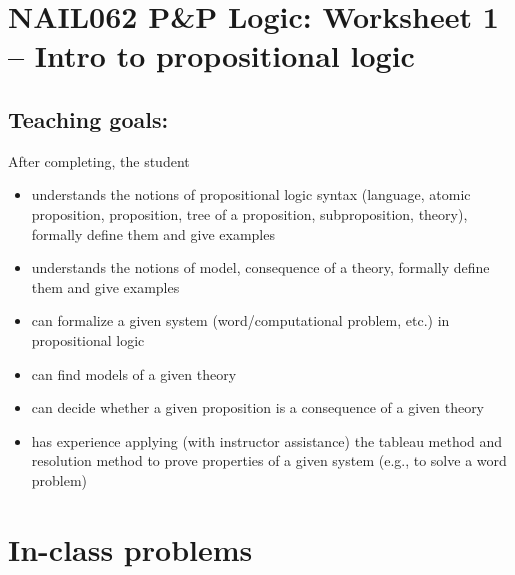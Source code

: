\section*{NAIL062 P\&P Logic: Worksheet 1 -- Intro to propositional logic}

\subsection*{Teaching goals:} After completing, the student

    \begin{itemize}\setlength{\itemsep}{0pt}
        \item understands the notions of propositional logic syntax (language, atomic proposition, proposition, tree of a proposition, subproposition, theory), formally define them and give examples
        \item understands the notions of model, consequence of a theory, formally define them and give examples
        \item can formalize a given system (word/computational problem, etc.) in propositional logic
        \item can find models of a given theory
        \item can decide whether a given proposition is a consequence of a given theory
        \item has experience applying (with instructor assistance) the tableau method and resolution method to prove properties of a given system (e.g., to solve a word problem)
    \end{itemize}


\section*{In-class problems}


